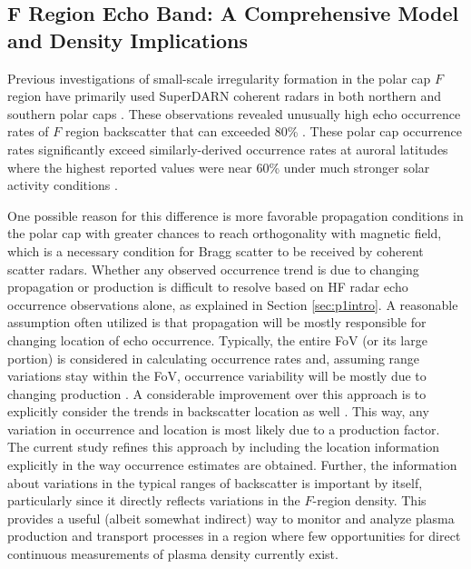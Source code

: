 \subsection{\(\mathbf{F}\) Region Echo Band: A Comprehensive Model and Density Implications}

Previous investigations of small-scale irregularity formation in the polar cap \(F\) region have primarily used SuperDARN coherent radars in both northern and southern polar caps \citep{Bristow2011,Ghezelbash2014b,Koustov2014}. These observations revealed unusually high echo occurrence rates of \(F\) region backscatter that can exceeded 80\% \citep{Bristow2011,Ghezelbash2014b}. These polar cap occurrence rates significantly exceed similarly-derived occurrence rates at auroral latitudes where the highest reported values were near 60\% under much stronger solar activity conditions \citep[e.g.][]{Koustov2004}.

One possible reason for this difference is more favorable propagation conditions in the polar cap with greater chances to reach orthogonality with magnetic field, which is a necessary condition for Bragg scatter to be received by coherent scatter radars. Whether any observed occurrence trend is due to changing propagation or production is difficult to resolve based on HF radar echo occurrence observations alone, as explained in Section \ref{sec:p1intro}. A reasonable assumption often utilized is that propagation will be mostly responsible for changing location of echo occurrence. Typically, the entire FoV (or its large portion) is considered in calculating occurrence rates and, assuming range variations stay within the FoV, occurrence variability will be mostly due to changing production \citep[e.g.][]{Kane2010}. A considerable improvement over this approach is to explicitly consider the trends in backscatter location as well \citep{Kane2012,Ghezelbash2014b}. This way, any variation in occurrence and location is most likely due to a production factor. The current study refines this approach by including the location information explicitly in the way occurrence estimates are obtained. Further, the information about variations in the typical ranges of backscatter is important by itself, particularly since it directly reflects variations in the \(F\)-region density. This provides a useful (albeit somewhat indirect) way to monitor and analyze plasma production and transport processes in a region where few opportunities for direct continuous measurements of plasma density currently exist.


